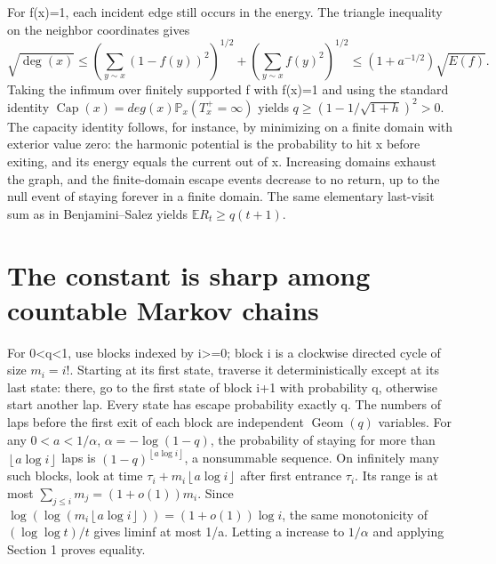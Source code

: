 \documentclass[11pt]{article}
\begin{document}
For f(x)=1, each incident edge still occurs in the energy. The triangle inequality on the neighbor coordinates gives
\[
\sqrt{\deg(x)}
\le \left(\sum_{y\sim x}(1-f(y))^2\right)^{1/2}
 + \left(\sum_{y\sim x} f(y)^2\right)^{1/2}
\le (1+a^{-1/2})\sqrt{E(f)}.
\]
Taking the infimum over finitely supported f with f(x)=1 and using the standard identity \(\operatorname{Cap}(x)=deg(x) \mathbb{P}_x(T_x^+=\infty )\) yields \(q \ge  (1-1/\sqrt{1+h})^2>0\). The capacity identity follows, for instance, by minimizing on a finite domain with exterior value zero: the harmonic potential is the probability to hit x before exiting, and its energy equals the current out of x. Increasing domains exhaust the graph, and the finite-domain escape events decrease to no return, up to the null event of staying forever in a finite domain. The same elementary last-visit sum as in Benjamini--Salez yields \(\mathbb{E} R_t \ge  q(t+1)\).

\section{The constant is sharp among countable Markov chains}\label{the-constant-is-sharp-among-countable-markov-chains}

For 0\textless q\textless1, use blocks indexed by i\textgreater=0; block i is a clockwise directed cycle of size \(m_i=i!\). Starting at its first state, traverse it deterministically except at its last state: there, go to the first state of block i+1 with probability q, otherwise start another lap. Every state has escape probability exactly q. The numbers of laps before the first exit of each block are independent \(\operatorname{Geom}(q)\) variables. For any \(0<a<1/\alpha\), \(\alpha =-\log (1-q)\), the probability of staying for more than \(\left\lfloor a \log  i\right\rfloor\) laps is \((1-q)^{\left\lfloor a \log  i\right\rfloor}\), a nonsummable sequence. On infinitely many such blocks, look at time \(\tau _i+m_i \left\lfloor a \log  i\right\rfloor\) after first entrance \(\tau _i\). Its range is at most \(\sum _{j\le i} m_j=(1+o(1))m_i\). Since \(\log (\log (m_i \left\lfloor a \log  i\right\rfloor))=(1+o(1))\log  i\), the same monotonicity of \((\log  \log  t)/t\) gives liminf at most 1/a. Letting a increase to \(1/\alpha\) and applying Section 1 proves equality.
\end{document}
